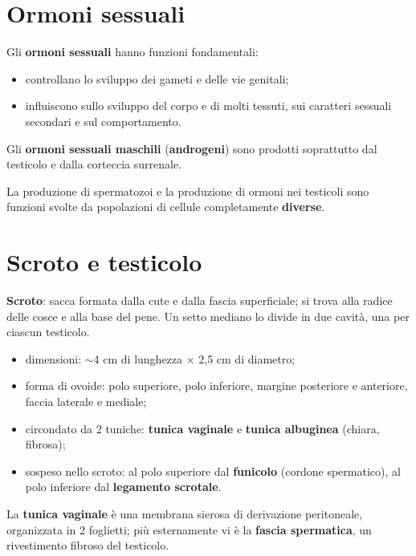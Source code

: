 \section{Ormoni sessuali}

Gli \textbf{ormoni sessuali} hanno funzioni fondamentali:
\begin{itemize}
  \item controllano lo sviluppo dei gameti e delle vie genitali;
  \item influiscono sullo sviluppo del corpo e di molti tessuti, sui caratteri sessuali secondari e
    sul comportamento.
\end{itemize}

Gli \textbf{ormoni sessuali maschili} (\textbf{androgeni}) sono prodotti soprattutto dal testicolo
e dalla corteccia surrenale.

La produzione di spermatozoi e la produzione di ormoni nei testicoli sono funzioni svolte da
popolazioni di cellule completamente \textbf{diverse}.

\section{Scroto e testicolo}

\textbf{Scroto}: sacca formata dalla cute e dalla fascia superficiale; si trova alla radice delle
cosce e alla base del pene. Un setto mediano lo divide in due cavità, una per ciascun testicolo.

\begin{itemize}
  \item dimensioni: $\sim$4 cm di lunghezza $\times$ 2,5 cm di diametro;
  \item forma di ovoide: polo superiore, polo inferiore, margine posteriore e anteriore, faccia
    laterale e mediale;
  \item circondato da 2 tuniche: \textbf{tunica vaginale} e \textbf{tunica albuginea} (chiara,
    fibrosa);
  \item sospeso nello scroto: al polo superiore dal \textbf{funicolo} (cordone spermatico), al polo
    inferiore dal \textbf{legamento scrotale}.
\end{itemize}

La \textbf{tunica vaginale} è una membrana sierosa di derivazione peritoneale, organizzata in 2
foglietti; più esternamente vi è la \textbf{fascia spermatica}, un rivestimento fibroso del
testicolo.

